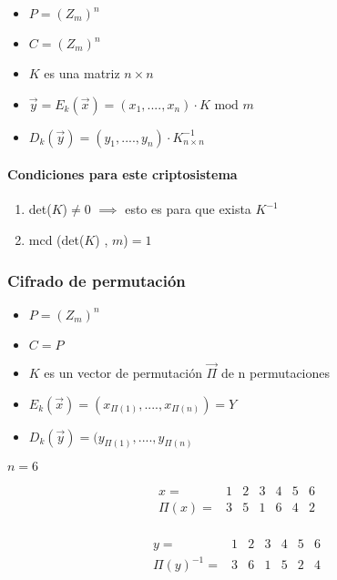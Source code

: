 \begin{itemize}
	\item $P= (Z_m)^{n}$
	\item $C = (Z_m)^{n}$
	\item $K$ es una matriz $n \times n$
	\item $\overrightarrow{y} = E_{k}(\overrightarrow{x}) = (x_1,....,x_n) \cdot K \text{ mod } m$
	\item $D_{k}(\overrightarrow{y})= (y_1,....,y_n) \cdot K^{-1}_{n \times n}$
\end{itemize}
\paragraph{Condiciones para este criptosistema}
\begin{enumerate}
	\item det($K$)$\neq 0$ $\implies$ esto es para que exista $K^{-1}$
	\item mcd (det($K$) , $m$)$= 1$
\end{enumerate}

\subsubsection{Cifrado de permutación}
\begin{itemize}
	\item $P= (Z_m)^{n}$
	\item $C = P$
	\item $K$ es un vector de permutación $\overrightarrow{\Pi}$ de n permutaciones
	\item $E_{k}(\overrightarrow{x}) = (x_{\Pi(1)},....,x_{\Pi(n)})= Y$
	\item $D_{k}(\overrightarrow{y})= (y_{\Pi(1)},....,y_{\Pi(n)}$
\end{itemize}

\begin{example}
	
	$n=6$
	
	$$\begin{matrix}
	x = & 1 & 2 & 3 & 4 & 5 & 6\\
	\Pi(x) = & 3 & 5 & 1 & 6 & 4 & 2\\
	\end{matrix}$$
	
	$$\begin{matrix}
	y = & 1 & 2 & 3 & 4 & 5 & 6\\
	\Pi(y)^{-1} = & 3 & 6 & 1 & 5 & 2 & 4\\
	\end{matrix}$$
\end{example}

